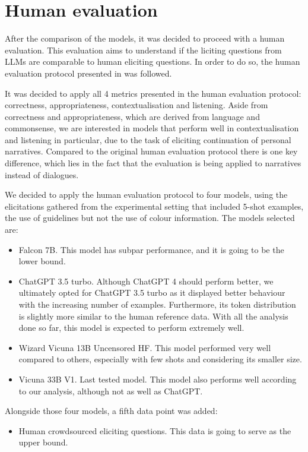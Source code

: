 
\section{Human evaluation}
After the comparison of the models, it was decided to proceed with a human evaluation. This evaluation aims to understand if the liciting questions from LLMs are comparable to human eliciting questions. In order to do so, the human evaluation protocol presented in \cite{mousavi-etal-2022-evaluation} was followed. 

It was decided to apply all 4 metrics presented in the human evaluation protocol: correctness, appropriateness, contextualisation and listening. Aside from correctness and appropriateness, which are derived from language and commonsense, we are interested in models that perform well in contextualisation and listening in particular, due to the task of eliciting continuation of personal narratives. Compared to the original human evaluation protocol there is one key difference, which lies in the fact that the evaluation is being applied to narratives instead of dialogues. 

We decided to apply the human evaluation protocol to four models, using the elicitations gathered from the experimental setting that included 5-shot examples, the use of guidelines but not the use of colour information. The models selected are:
\begin{itemize}
\item Falcon 7B. This model has subpar performance, and it is going to be the lower bound.
    \item ChatGPT 3.5 turbo. Although ChatGPT 4 should perform better, we ultimately opted for ChatGPT 3.5 turbo as it displayed better behaviour with the increasing number of examples. Furthermore, its token distribution is slightly more similar to the human reference data. With all the analysis done so far, this model is expected to perform extremely well.
    \item Wizard Vicuna 13B Uncensored HF. This model performed very well compared to others, especially with few shots and considering its smaller size.
    \item Vicuna 33B V1. Last tested model. This model also performs well according to our analysis, although not as well as ChatGPT.
\end{itemize}
Alongside those four models, a fifth data point was added:
\begin{itemize}
    \item Human crowdsourced eliciting questions. This data is going to serve as the upper bound.
\end{itemize}


